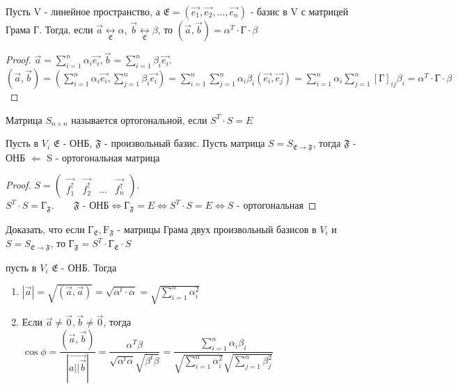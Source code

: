 \begin{theorem}
		Пусть V - линейное пространство, а \(\mathfrak{E} = (\vec{e_1}, \vec{e_2}, \ldots, \vec{e_n})\) - базис в V с матрицей Грама Г. Тогда, если \(\vec{a}\underset{\mathfrak{E}}{\longleftrightarrow}\alpha\), 
		\(\vec{b}\underset{\mathfrak{E}}{\longleftrightarrow}\beta\), то \((\vec{a}, \vec{b}) = \alpha^T\cdot\text{Г}\cdot\beta\)
\end{theorem}
\begin{proof}
	\(\vec{a} = \sum_{i = 1}^{n}\alpha_i\vec{e_i}, \vec{b} = \sum_{i = 1}^{n}\beta_i\vec{e_i}\). \\[5mm]
	\((\vec{a}, \vec{b}) = (\sum_{i = 1}^{n}\alpha_i\vec{e_i}, \sum_{j = 1}^{n}\beta_i\vec{e_i}) = \sum_{i = 1}^{n}\sum_{j = 1}^{n}\alpha_i\beta_i(\vec{e_i}, \vec{e_j}) = \sum_{i = 1}^{n}\alpha_i\sum_{j = 1}^{n}[\text{Г}]_{ij}\beta_i = \alpha^T\cdot\text{Г}\cdot\beta\)
\end{proof}
\begin{definition}
	Матрица \(S_{n\times n} \) называется ортогональной, если \(S^T\cdot S = E\)
\end{definition}
\begin{proposition}
	Пусть в \(V_i\) \(\mathfrak{E}\) - ОНБ, \(\mathfrak{F}\) - произвольный базис. Пусть матрица \(S = S_{\mathfrak{E}\to\mathfrak{F}}\), тогда \(\mathfrak{F}\) - ОНБ \(\Longleftarrow\) S - ортогональная матрица
\end{proposition}
\begin{proof}
	\(S = \begin{pmatrix}
		\vec{f_1^{\uparrow}} & \vec{f_2^{\uparrow}} & \ldots & \vec{f_n^{\uparrow}}
	\end{pmatrix}\). \\[5mm]
	\(S^T\cdot S = \text{Г}_{\mathfrak{F}}.\qquad \mathfrak{F}\text{ - ОНБ} \Longleftrightarrow \text{Г}_{\mathfrak{F}} = E \Longleftrightarrow S^T\cdot S = E \Longleftrightarrow S\text{ - ортогональная}\)
\end{proof}
\begin{exercise}
	Доказать, что если \(\text{Г}_{\mathfrak{E}}, \text{F}_{\mathfrak{F}}\) - матрицы Грама двух произвольный базисов в \(V_i\) и \(S = S_{\mathfrak{E}\to\mathfrak{F}}\), то \(\text{Г}_{\mathfrak{F}} = S^T\cdot\text{Г}_{\mathfrak{E}}\cdot S\)
\end{exercise}
\begin{proposition}
	пусть в \(V_i\) \(\mathfrak{E}\) - ОНБ. Тогда 
	\begin{enumerate}
		\item \(|\vec{a}| = \sqrt{(\vec{a}, \vec{a})} = \sqrt{\alpha^t\cdot\alpha} = \sqrt{\sum_{i = 1}^{n}\alpha_i^2}\)
		\item Если $\vec{a}\ne\vec{0}, \vec{b}\ne\vec{0}$, тогда \(\cos\phi = \dfrac{(\vec{a}, \vec{b})}{|\vec{a||\vec{b}}|} = \dfrac{\alpha^T\beta}{\sqrt{\alpha^t\alpha}\sqrt{\beta^t\beta}} = \dfrac{\sum_{i = 1}^{n}\alpha_i\beta_i}{\sqrt{\sum_{i = 1}^{n}\alpha_i^2}\sqrt{\sum_{j = 1}^{n}\beta_j^2}}\)
	\end{enumerate}
\end{proposition}

